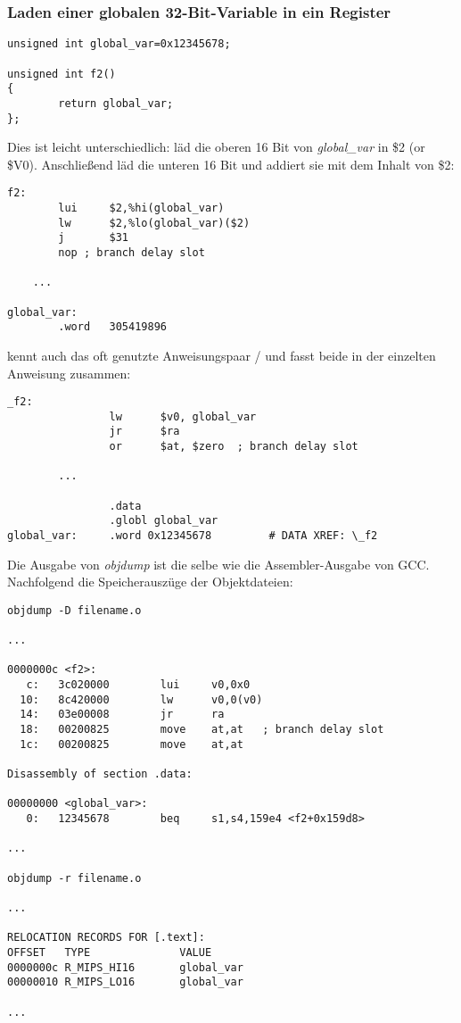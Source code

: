\subsubsection{Laden einer globalen 32-Bit-Variable in ein Register}

\begin{lstlisting}[style=customc]
unsigned int global_var=0x12345678;

unsigned int f2()
{
        return global_var;
};
\end{lstlisting}


Dies ist leicht unterschiedlich:  läd die oberen 16 Bit von \emph{global\_var}
in \$2 (or \$V0). Anschließend läd  die unteren 16 Bit und addiert sie mit
dem Inhalt von \$2:

\begin{lstlisting}[caption=GCC 4.4.5 -O3 (\assemblyOutput),style=customasmMIPS]
f2:
        lui     $2,%hi(global_var)
        lw      $2,%lo(global_var)($2)
        j       $31
        nop	; branch delay slot

	...

global_var:
        .word   305419896
\end{lstlisting}

\IDA kennt auch das oft genutzte Anweisungspaar / und fasst beide
in der einzelten Anweisung  zusammen:

\begin{lstlisting}[caption=GCC 4.4.5 -O3 (IDA),style=customasmMIPS]
_f2:
                lw      $v0, global_var
                jr      $ra
                or      $at, $zero	; branch delay slot

		...

                .data
                .globl global_var
global_var:     .word 0x12345678         # DATA XREF: \_f2
\end{lstlisting}

Die Ausgabe von \emph{objdump} ist die selbe wie die Assembler-Ausgabe von GCC.
Nachfolgend die Speicherauszüge der Objektdateien:

\begin{lstlisting}[caption=objdump,style=customasmMIPS]
objdump -D filename.o

...

0000000c <f2>:
   c:   3c020000        lui     v0,0x0
  10:   8c420000        lw      v0,0(v0)
  14:   03e00008        jr      ra
  18:   00200825        move    at,at	; branch delay slot
  1c:   00200825        move    at,at

Disassembly of section .data:

00000000 <global_var>:
   0:   12345678        beq     s1,s4,159e4 <f2+0x159d8>

...

objdump -r filename.o

...

RELOCATION RECORDS FOR [.text]:
OFFSET   TYPE              VALUE
0000000c R_MIPS_HI16       global_var
00000010 R_MIPS_LO16       global_var

...

\end{lstlisting}

